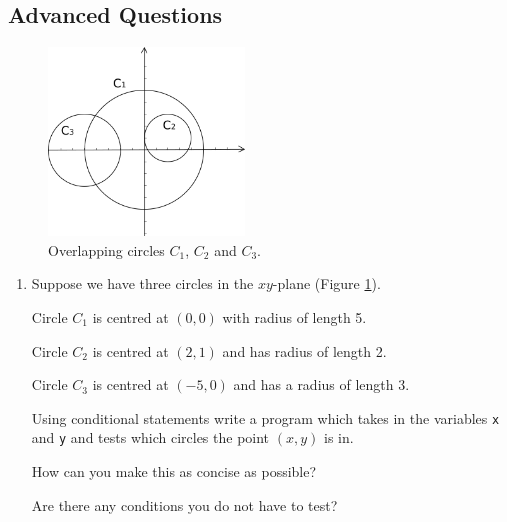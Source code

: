 \documentclass[11pt]{report}
\begin{document}
\subsection*{Advanced Questions}

\begin{figure}[!h]
        \centering
        \includegraphics[height=5cm]{circles}
        \caption{Overlapping circles $C_1$, $C_2$ and $C_3$.}
        \label{fig:circles}
\end{figure}

\begin{enumerate}[label=(\Alph*)]
    
    \item Suppose we have three circles in the $xy$-plane (Figure \ref{fig:circles}). 
    
    Circle $C_1$ is centred at $(0, 0)$ with radius of length 5. 
    
    Circle $C_2$ is centred at $(2, 1)$ and has radius of length 2. 
    
    Circle $C_3$ is centred at $(-5, 0)$ and has a radius of length 3. 
    
    Using conditional statements write a program which takes in the variables {\tt x} and {\tt y} and tests which circles the point $(x, y)$ is in. 
    
    How can you make this as concise as possible? 
    
    Are there any conditions you do not have to test?
\end{enumerate}


    

    
\end{document}
